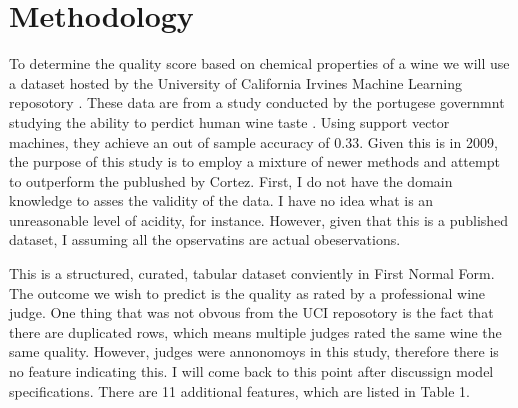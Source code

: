 \documentclass[16pt,twocolumn,letterpaper,titlepage]{article}
\begin{document}
\section{Methodology}

To determine the quality score based on chemical properties of a wine we will use a dataset hosted by the University of California Irvines Machine Learning reposotory \cite{Lichman:2013}. These data are from	a study conducted by the portugese governmnt studying the ability to perdict human wine taste \cite{Cortez}. Using support vector machines, they achieve an out of sample accuracy of 0.33. Given this is in 2009, the purpose of this study is to employ a mixture of newer methods and attempt to outperform the publushed by Cortez. First, I do not have the domain knowledge to asses the validity of the data. I have no idea what is an unreasonable level of acidity, for instance. However, given that this is a published dataset, I assuming all the opservatins are actual obeservations.

This is a structured, curated, tabular dataset conviently in First Normal Form. The outcome we wish to predict is the quality as rated by a professional wine judge. One thing that was not obvous from the UCI reposotory is the fact that there are duplicated rows, which means multiple judges rated the same wine the same quality. However, judges were annonomoys in this study, therefore there is no feature indicating this. I will come back to this point after discussign model specifications. There are 11 additional features, which are listed in Table 1.  
\end{document}
